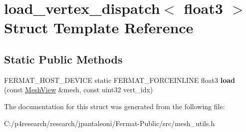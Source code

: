 \hypertarget{structload__vertex__dispatch_3_01float3_01_4}{}\section{load\+\_\+vertex\+\_\+dispatch$<$ float3 $>$ Struct Template Reference}
\label{structload__vertex__dispatch_3_01float3_01_4}
\subsection*{Static Public Methods}
\begin{DoxyCompactItemize}
\item 
\mbox{\label{structload__vertex__dispatch_3_01float3_01_4_a35f4bc231c93d91f96c71f8c33ac236c}} 
F\+E\+R\+M\+A\+T\+\_\+\+H\+O\+S\+T\+\_\+\+D\+E\+V\+I\+CE static F\+E\+R\+M\+A\+T\+\_\+\+F\+O\+R\+C\+E\+I\+N\+L\+I\+NE float3 {\bfseries load} (const \hyperlink{struct_mesh_view}{Mesh\+View} \&mesh, const uint32 vert\+\_\+idx)
\end{DoxyCompactItemize}


The documentation for this struct was generated from the following file\+:\begin{DoxyCompactItemize}
\item 
C\+:/p4research/research/jpantaleoni/\+Fermat-\/\+Public/src/mesh\+\_\+utils.\+h\end{DoxyCompactItemize}

